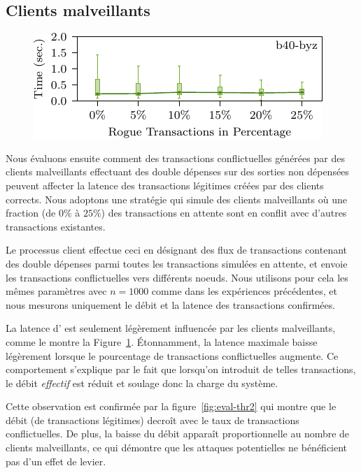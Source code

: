 \subsection{Clients malveillants}
\label{sec:evaluation-misbehaving}
\begin{figure}
\includegraphics[width=\linewidth]{figures/lat3.pdf}
\label{fig:eval-lat3}
\end{figure}

Nous évaluons ensuite comment des transactions conflictuelles générées par des clients malveillants effectuant des
double dépenses sur des sorties non dépensées peuvent affecter la latence des transactions légitimes créées par
des clients corrects. Nous adoptons une stratégie qui simule des clients malveillants où une fraction (de $0\%$ à $25\%$)
des transactions en attente sont en conflit avec d'autres transactions existantes.

Le processus client effectue ceci en désignant des flux de transactions contenant des double dépenses parmi toutes
les transactions simulées en attente, et envoie les transactions conflictuelles vers différents noeuds. Nous utilisons
pour cela les mêmes paramètres avec $n = 1000$ comme dans les expériences précédentes, et nous mesurons uniquement
le débit et la latence des transactions confirmées.

La latence d'{\sysname} est seulement légèrement influencée par les clients malveillants, comme le montre la
Figure~\ref{fig:eval-lat3}. Étonnamment, la latence maximale baisse légèrement lorsque le pourcentage de transactions
conflictuelles augmente. Ce comportement s'explique par le fait que lorsqu'on introduit de telles transactions, le débit
\emph{effectif} est réduit et soulage donc la charge du système.

Cette observation est confirmée par la figure~\ref{fig:eval-thr2} qui montre que le débit (de transactions légitimes)
decroît avec le taux de transactions conflictuelles. De plus, la baisse du débit apparaît proportionnelle au nombre de
clients malveillants, ce qui démontre que les attaques potentielles ne bénéficient pas d'un effet de levier.

